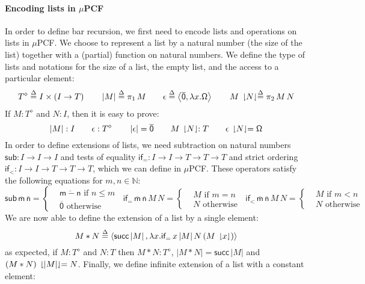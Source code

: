 \documentclass{CSML}
\newcommand*\Def{\mathrel{\overset{\Delta}{=}}}
\newcommand*\LmSortTimes\times
\newcommand*\LmSortTo\to
\newcommand*\LmSortA{T}
\newcommand*\LmTerm[2]{#1\mathrel{:}#2}
\newcommand*\LmTermA{M}
\newcommand*\LmTermB{N}
\newcommand*\LmVarA{x}
\newcommand*\LmConst[1]{\mathsf{#1}}
\newcommand*\LmPair[2]{\left\langle#1,#2\right\rangle}
\newcommand*\LmProj{\pi}
\newcommand*\CASortList[1]{{#1}^\diamond}
\newcommand*\CALmn[1]{\LmConst{\overline{#1}}}
\newcommand*\CALmnSort{I}
\newcommand*\CALmom{\LmConst{\Omega}}
\newcommand*\CALmsucc{\LmConst{succ}}
\newcommand*\CALmsub{\LmConst{sub}}
\newcommand*\CALmsubSort{\CALmnSort\LmSortTo\CALmnSort\LmSortTo\CALmnSort}
\newcommand*\CALmifl{\LmConst{if_<}}
\newcommand*\CALmiflSort[1]{\CALmnSort\LmSortTo\CALmnSort\LmSortTo#1\LmSortTo#1\LmSortTo#1}
\newcommand*\CALmife{\LmConst{if_=}}
\newcommand*\CALmifeSort[1]{\CALmnSort\LmSortTo\CALmnSort\LmSortTo#1\LmSortTo#1\LmSortTo#1}
\newcommand*\CALmextend{\mathbin{*}}
\newcommand*\CALmnil{\epsilon}
\newcommand*\CALmlen[1]{\left|#1\right|}
\newcommand*\CALmind[2]{#1\,\downharpoonright\mkern-5mu#2\mkern-5mu\downharpoonleft}
\begin{document}
\paragraph{Encoding lists in $\mu$PCF}
In order to define bar recursion, we first need to encode lists and operations on lists in $\mu$PCF. We choose to represent a list by a natural number (the size of the list) together with a (partial) function on natural numbers. We define the type of lists and notations for the size of a list, the empty list, and the access to a particular element:
$$\CASortList{\LmSortA}\Def\CALmnSort\LmSortTimes\left(\CALmnSort\LmSortTo\LmSortA\right)
\qquad
\CALmlen{\LmTermA}\Def\LmProj_1\,\LmTermA
\qquad
\CALmnil\Def\LmPair{\CALmn{0}}{\lambda\LmVarA.\CALmom}
\qquad
\CALmind{\LmTermA}{\LmTermB}\Def\LmProj_2\,\LmTermA\,\LmTermB$$
If $\LmTerm{\LmTermA}{\CASortList{\LmSortA}}$ and $\LmTerm{\LmTermB}{\CALmnSort}$, then it is easy to prove:
$$\LmTerm{\CALmlen{\LmTermA}}{\CALmnSort}
\qquad
\LmTerm{\CALmnil}{\CASortList{\LmSortA}}
\qquad
\CALmlen{\CALmnil}=\CALmn{0}
\qquad
\LmTerm{\CALmind{\LmTermA}{\LmTermB}}{\LmSortA}
\qquad
\CALmind{\CALmnil}{\LmTermB}=\CALmom$$
In order to define extensions of lists, we need subtraction on natural numbers $\LmTerm{\CALmsub}{\CALmsubSort}$ and tests of equality $\LmTerm{\CALmife}{\CALmifeSort{\LmSortA}}$ and strict ordering $\LmTerm{\CALmifl}{\CALmiflSort{\LmSortA}}$, which we can define in $\mu$PCF. These operators satisfy the following equations for $m,n\in\mathbb{N}$:
$$\CALmsub\,\CALmn{m}\,\CALmn{n}=\left\{\begin{aligned}&\CALmn{m-n}\text{ if }n\leq m\\&\CALmn{0}\text{ otherwise}\end{aligned}\right.
\;\;
\CALmife\,\CALmn{m}\,\CALmn{n}\,\LmTermA\,\LmTermB=\left\{\begin{aligned}&\LmTermA\text{ if }m=n\\&\LmTermB\text{ otherwise}\end{aligned}\right.
\;\;
\CALmifl\,\CALmn{m}\,\CALmn{n}\,\LmTermA\,\LmTermB=\left\{\begin{aligned}&\LmTermA\text{ if }m<n\\&\LmTermB\text{ otherwise}\end{aligned}\right.$$
We are now able to define the extension of a list by a single element:
$$\LmTermA\CALmextend\LmTermB\Def\LmPair{\CALmsucc\CALmlen{\LmTermA}}{\lambda\LmVarA.\CALmife\,\LmVarA\CALmlen{\LmTermA}\LmTermB\left(\CALmind{\LmTermA}{\LmVarA}\right)}$$
as expected, if $\LmTerm{\LmTermA}\CASortList{\LmSortA}$ and $\LmTerm{\LmTermB}{\LmSortA}$ then $\LmTerm{\LmTermA\CALmextend\LmTermB}{\CASortList{\LmSortA}}$, $\CALmlen{\LmTermA\CALmextend\LmTermB}=\CALmsucc\,\CALmlen{\LmTermA}$ and $\CALmind{\left(\LmTermA\CALmextend\LmTermB\right)}{\CALmlen{\LmTermA}}=\LmTermB$. Finally, we define infinite extension of a list with a constant element:
\end{document}
